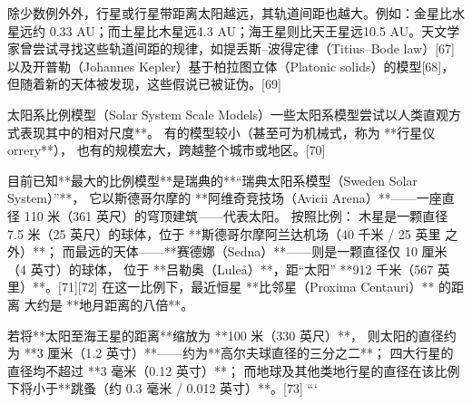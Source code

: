 除少数例外外，行星或行星带距离太阳越远，其轨道间距也越大。例如：金星比水星远约 0.33 AU；而土星比木星远4.3 AU；海王星则比天王星远10.5 AU。天文学家曾尝试寻找这些轨道间距的规律，如提丢斯–波得定律（Titius–Bode law）[67]以及开普勒（Johannes Kepler）基于柏拉图立体（Platonic solids）的模型[68]，但随着新的天体被发现，这些假说已被证伪。[69]

太阳系比例模型（Solar System Scale Models）一些太阳系模型尝试以人类直观方式表现其中的相对尺度**。  
有的模型较小（甚至可为机械式，称为 **行星仪 orrery**），  
也有的规模宏大，跨越整个城市或地区。[70]  

目前已知**最大的比例模型**是瑞典的**“瑞典太阳系模型（Sweden Solar System）”**，  
它以斯德哥尔摩的 **阿维奇竞技场（Avicii Arena）**——一座直径 110 米（361 英尺）的穹顶建筑——代表太阳。  
按照比例：  
木星是一颗直径 7.5 米（25 英尺）的球体，位于 **斯德哥尔摩阿兰达机场（40 千米 / 25 英里 之外）**；  
而最远的天体——**赛德娜（Sedna）**——则是一颗直径仅 10 厘米（4 英寸）的球体，  
位于 **吕勒奥（Luleå）**，距“太阳” **912 千米（567 英里）**。[71][72]  
在这一比例下，最近恒星 **比邻星（Proxima Centauri）** 的距离  
大约是 **地月距离的八倍**。

若将**太阳至海王星的距离**缩放为 **100 米（330 英尺）**，  
则太阳的直径约为 **3 厘米（1.2 英寸）**——约为**高尔夫球直径的三分之二**；  
四大行星的直径均不超过 **3 毫米（0.12 英寸）**；  
而地球及其他类地行星的直径在该比例下将小于**跳蚤（约 0.3 毫米 / 0.012 英寸）**。[73]
```

